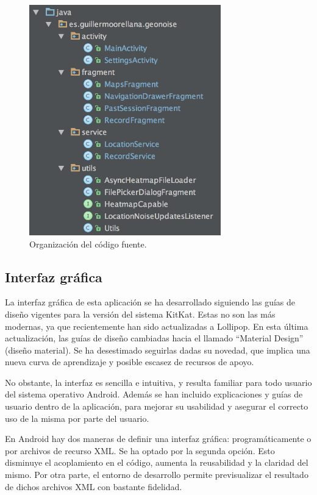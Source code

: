  \begin{figure}[h] \centering
    \includegraphics[height=10cm]{graphs/srctree.png} \caption{Organización del código fuente.}\label{fig:srctree}
\end{figure}
 
\subsection{Interfaz gráfica}

    La interfaz gráfica de esta aplicación se ha desarrollado siguiendo las guías de diseño vigentes para la versión del sistema KitKat. Estas no son las más modernas, ya que recientemente han sido actualizadas a Lollipop. En esta última actualización, las guías de diseño cambiadas hacia el llamado “Material Design” (diseño material). Se ha desestimado seguirlas dadas su novedad, que implica una nueva curva de aprendizaje y posible escasez de recursos de apoyo.

    No obstante, la interfaz es sencilla e intuitiva, y resulta familiar para todo usuario del sistema operativo Android. Además se han incluido explicaciones y guías de usuario dentro de la aplicación, para mejorar su usabilidad y asegurar el correcto uso de la misma por parte del usuario.

    En Android hay dos maneras de definir una interfaz gráfica: programáticamente o por archivos de recurso XML. Se ha optado por la segunda opción. Esto disminuye el acoplamiento en el código, aumenta la reusabilidad y la claridad del mismo. Por otra parte, el entorno de desarrollo permite previsualizar el resultado de dichos archivos XML con bastante fidelidad.


